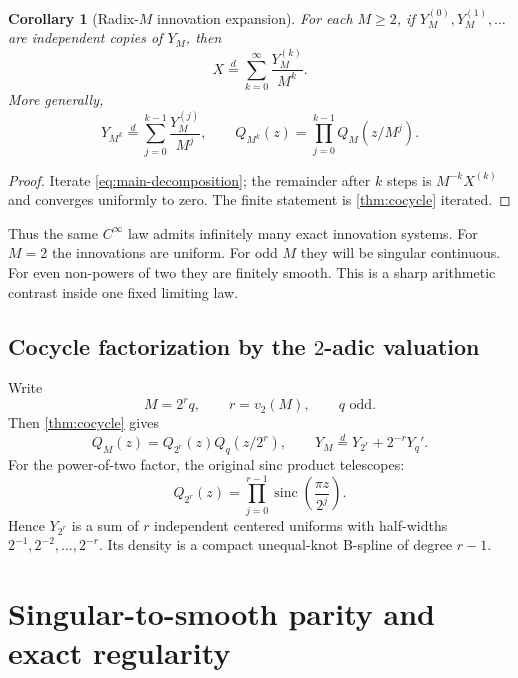 \documentclass[11pt,oneside]{article}
\newtheorem{corollary}[theorem]{Corollary}
\theoremstyle{definition}
\theoremstyle{remark}
\newcommand{\sinc}{\operatorname{sinc}}
\newcommand{\vtwo}{v_2}
\numberwithin{equation}{section}
\newcommand{\1}{\mathbf 1}
\begin{document}
\begin{corollary}[Radix-$M$ innovation expansion]
\label{cor:innovation}
For each $M\ge2$, if $Y_M^{(0)},Y_M^{(1)},\ldots$ are independent copies of $Y_M$, then
\begin{equation}
 X\overset d=\sum_{k=0}^{\infty}\frac{Y_M^{(k)}}{M^k}.
 \label{eq:innovation-expansion}
\end{equation}
More generally,
\begin{equation}
 Y_{M^k}\overset d=
 \sum_{j=0}^{k-1}\frac{Y_M^{(j)}}{M^j},
 \qquad
 Q_{M^k}(z)=\prod_{j=0}^{k-1}Q_M(z/M^j).
 \label{eq:finite-innovation}
\end{equation}
\end{corollary}

\begin{proof}
Iterate \eqref{eq:main-decomposition}; the remainder after $k$ steps is $M^{-k}X^{(k)}$
and converges uniformly to zero.  The finite statement is \cref{thm:cocycle} iterated.
\end{proof}

Thus the same $C^\infty$ law admits infinitely many exact innovation systems.  For
$M=2$ the innovations are uniform.  For odd $M$ they will be singular continuous.  For
even non-powers of two they are finitely smooth.  This is a sharp arithmetic contrast
inside one fixed limiting law.

\subsection{Cocycle factorization by the $2$-adic valuation}

Write
\begin{equation}
 M=2^r q,
 \qquad r=\vtwo(M),
 \qquad q\text{ odd}.
 \label{eq:M-rq}
\end{equation}
Then \cref{thm:cocycle} gives
\begin{equation}
 Q_M(z)=Q_{2^r}(z)Q_q(z/2^r),
 \qquad
 Y_M\overset d=Y_{2^r}+2^{-r}Y_q'.
 \label{eq:2adic-factorization}
\end{equation}
For the power-of-two factor, the original sinc product telescopes:
\begin{equation}
 Q_{2^r}(z)=\prod_{j=0}^{r-1}\sinc\!\left(\frac{\pi z}{2^j}\right).
 \label{eq:power-two-Q}
\end{equation}
Hence $Y_{2^r}$ is a sum of $r$ independent centered uniforms with half-widths
$2^{-1},2^{-2},\ldots,2^{-r}$.  Its density is a compact unequal-knot B-spline of degree
$r-1$.

\section{Singular-to-smooth parity and exact regularity}
\label{sec:parity}
\end{document}
